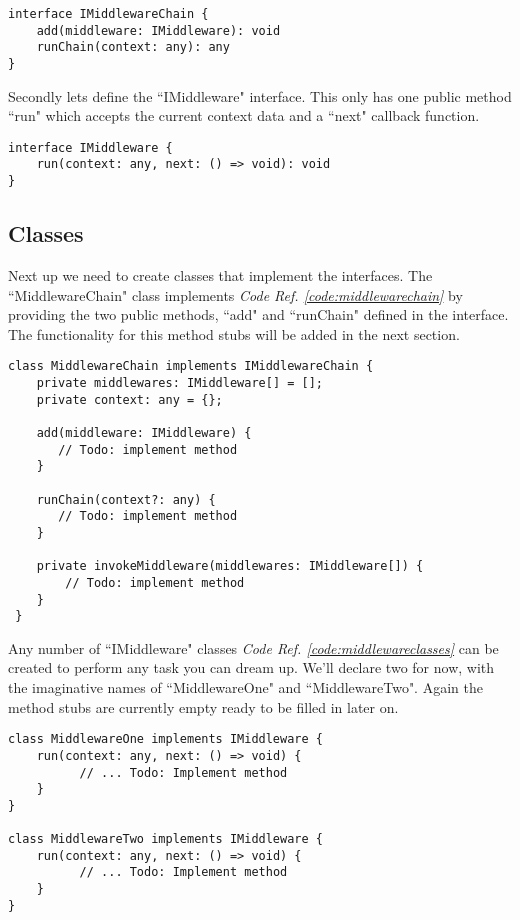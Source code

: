 \documentclass[12pt]{article}
\newcommand{\coderef}[1]{\textit{Code Ref. \ref{#1}}}
\begin{document}
\begin{lstlisting}[caption=IMiddlewareChain,label=code:imiddlewarechain]
interface IMiddlewareChain {
    add(middleware: IMiddleware): void
    runChain(context: any): any
}
\end{lstlisting}

Secondly lets define the ``IMiddleware" interface. This only has one public method ``run"  which accepts the current context data and a ``next" callback function. 

\begin{lstlisting}[caption=IMiddleware,label=code:imiddleware]
interface IMiddleware {
    run(context: any, next: () => void): void
}
\end{lstlisting}

\subsection{Classes}

Next up we need to create classes that implement the interfaces. The ``MiddlewareChain" class implements \coderef{code:middlewarechain} by providing the two public methods, ``add" and ``runChain" defined in the interface. The functionality for this method stubs will be added in the next section.

\begin{lstlisting}[caption=MiddlewareChain Class,label=code:middlewarechain]
class MiddlewareChain implements IMiddlewareChain {
    private middlewares: IMiddleware[] = [];
    private context: any = {};
   
    add(middleware: IMiddleware) {
       // Todo: implement method
    }

    runChain(context?: any) {
       // Todo: implement method
    }

    private invokeMiddleware(middlewares: IMiddleware[]) {
        // Todo: implement method
    }
 }
\end{lstlisting}

Any number of ``IMiddleware" classes \coderef{code:middlewareclasses} can be created to perform any task you can dream up. We'll declare two for now, with the imaginative names of ``MiddlewareOne" and ``MiddlewareTwo". Again the method stubs are currently empty ready to be filled in later on.

\begin{lstlisting}[caption=Middleware Classes,label=code:middlewareclasses]
class MiddlewareOne implements IMiddleware {
    run(context: any, next: () => void) {
          // ... Todo: Implement method
    }
}

class MiddlewareTwo implements IMiddleware {
    run(context: any, next: () => void) {
          // ... Todo: Implement method
    }
}
\end{lstlisting}
\end{document}
